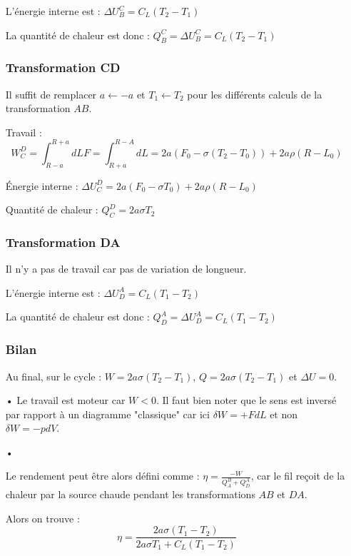 \documentclass{report}
\begin{document}
\begin{itemize}
L'énergie interne est : $\Delta U_B^C=C_L(T_2-T_1)$

La quantité de chaleur est donc : $Q_B^C=\Delta U_B^C = C_L(T_2-T_1)$

\subsubsection*{Transformation CD}
Il suffit de remplacer $a\longleftarrow -a$ et $T_1\longleftarrow T_2$ pour les différents calculs de la transformation $AB$.

Travail :
\begin{equation}
W_C^D=\int_{R-a}^{R+a}dL F = \int_{R+a}^{R-A}dL =2a\left( F_0-\sigma(T_2-T_0)  \right) +2a\rho(R-L_0)
\end{equation}

Énergie interne : $\Delta U_C^D = 2a(F_0-\sigma T_0)+2a\rho(R-L_0)$

Quantité de chaleur : $Q_C^D=2a\sigma T_2$

\subsubsection*{Transformation DA}
Il n'y a pas de travail car pas de variation de longueur.

L'énergie interne est : $\Delta U_D^A=C_L(T_1-T_2)$

La quantité de chaleur est donc : $Q_D^A=\Delta U_D^A = C_L(T_1-T_2)$

\subsubsection*{Bilan}
Au final, sur le cycle : 
$W=2a\sigma(T_2-T_1)$, $Q=2a\sigma(T_2-T_1)$ et $\Delta U=0$.

\item[•]
Le travail est moteur car $W<0$. Il faut bien noter que le sens est inversé par rapport à un diagramme "classique" car ici $\delta W = +FdL$ et non $\delta W = - pdV$.

\item[•]

Le rendement peut être alors défini comme : $\eta = \frac{-W}{Q_A^B + Q_D^A}$, car le fil reçoit de la chaleur par la source chaude pendant les transformations $AB$ et $DA$.

Alors on trouve :
\begin{equation}
\eta = \frac{2a\sigma(T_1-T_2)}{2a\sigma T_1+C_L(T_1-T_2)}
\end{equation}

\end{itemize}
\end{document}
